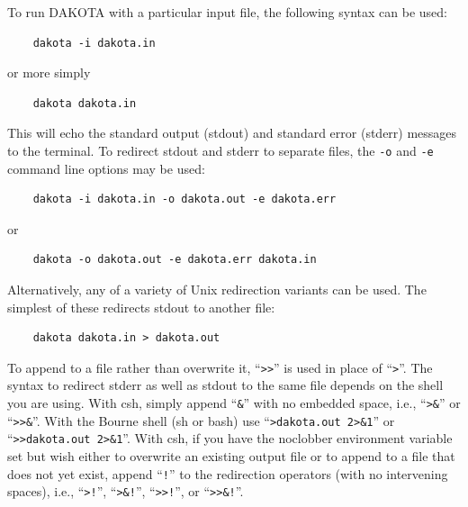 To run DAKOTA with a particular input file, the following syntax can
be used:
\begin{small}
\begin{verbatim}
    dakota -i dakota.in
\end{verbatim}
\end{small}
or more simply
\begin{small}
\begin{verbatim}
    dakota dakota.in
\end{verbatim}
\end{small}

This will echo the standard output (stdout) and standard error
(stderr) messages to the terminal. To redirect stdout and stderr to
separate files, the \texttt{-o} and \texttt{-e} command line options
may be used:
\begin{small}
\begin{verbatim}
    dakota -i dakota.in -o dakota.out -e dakota.err
\end{verbatim}
\end{small}
or
\begin{small}
\begin{verbatim}
    dakota -o dakota.out -e dakota.err dakota.in
\end{verbatim}
\end{small}

Alternatively, any of a variety of Unix redirection variants can be
used. The simplest of these redirects stdout to another file:
\begin{small}
\begin{verbatim}
    dakota dakota.in > dakota.out
\end{verbatim}
\end{small}

To append to a file rather than overwrite it, ``\texttt{>>}'' is used
in place of ``\texttt{>}''. The syntax to redirect stderr as well as stdout
to the same file depends on the shell you are using.  With csh, simply append
``\texttt{\&}'' with no embedded space, i.e.,
``\texttt{>\&}'' or ``\texttt{>>\&}''. With the Bourne shell (sh or bash) use
``\texttt{>dakota.out 2>\&1}'' or ``\texttt{>>dakota.out 2>\&1}''.
With csh, if you have the noclobber environment variable set but
wish either to overwrite an existing output file or to append to a file that
does not yet exist, append ``\texttt{!}'' to the redirection operators
(with no intervening spaces), i.e.,
``\texttt{>!}'', ``\texttt{>\&!}'', ``\texttt{>>!}'', or
``\texttt{>>\&!}''.

